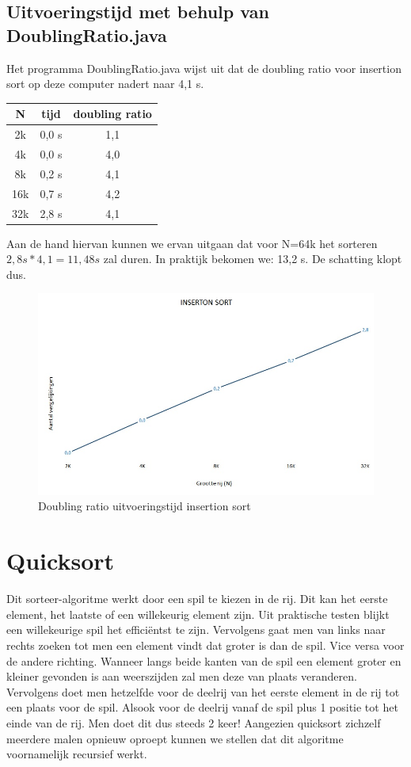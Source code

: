 \documentclass{article}
\begin{document}
\subsection{Uitvoeringstijd met behulp van DoublingRatio.java}
Het programma DoublingRatio.java wijst uit dat de doubling ratio voor insertion sort op deze computer nadert naar 4,1 s.

\centering{}
\begin{tabular}{| c | c | c |}
\hline
  N & tijd & doubling ratio \\
  \hline
    2k & 0,0 s & 1,1 \\
  \hline
  4k & 0,0 s & 4,0 \\
  \hline
  8k & 0,2 s & 4,1 \\
  \hline
 16k & 0,7 s & 4,2 \\
  \hline
 32k & 2,8 s & 4,1 \\
  \hline
\end{tabular}

\raggedright
Aan de hand hiervan kunnen we ervan uitgaan dat voor N=64k het sorteren $ 2,8 s * 4,1 = 11,48 s $ zal duren. In praktijk bekomen we: 13,2 s. De schatting klopt dus.

\begin{figure}[h!]
\centering
\includegraphics[scale=0.7]{ratio_insertion.jpg}
\caption{Doubling ratio uitvoeringstijd insertion sort}
\label{fig:ratio_insertion}
\end{figure}

\newpage
\section{Quicksort}
Dit sorteer-algoritme werkt door een spil te kiezen in de rij. Dit kan het eerste element, het laatste of een willekeurig element zijn. Uit praktische testen blijkt een willekeurige spil het efficiëntst te zijn. Vervolgens gaat men van links naar rechts zoeken tot men een element vindt dat groter is dan de spil. Vice versa voor de andere richting. Wanneer langs beide kanten van de spil een element groter en kleiner gevonden is aan weerszijden zal men deze van plaats veranderen. Vervolgens doet men hetzelfde voor de deelrij van het eerste element in de rij tot een plaats voor de spil. Alsook voor de deelrij vanaf de spil plus 1 positie tot het einde van de rij. Men doet dit dus steeds 2 keer! Aangezien quicksort zichzelf meerdere malen opnieuw oproept kunnen we stellen dat dit algoritme voornamelijk recursief werkt.
\end{document}

